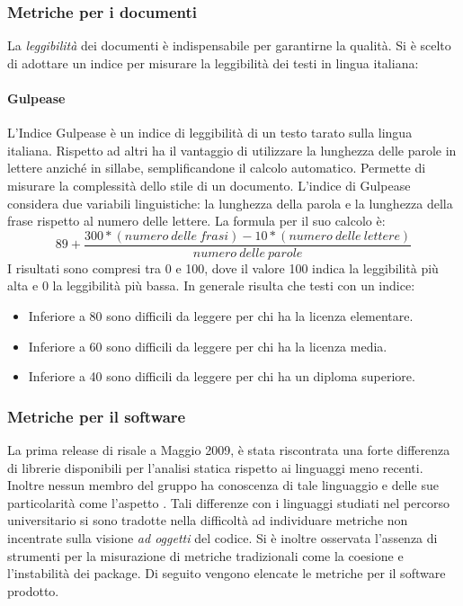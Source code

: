 		\subsubsection{Metriche per i documenti}
		La \emph{leggibilità} dei documenti è indispensabile per garantirne la qualità. Si è scelto di adottare un indice per misurare la leggibilità dei testi in lingua italiana:
			\paragraph{Gulpease}
			L'Indice Gulpease è un indice di leggibilità di un testo tarato sulla lingua italiana. Rispetto ad altri ha il vantaggio di utilizzare la lunghezza delle parole in lettere anziché in sillabe, semplificandone il calcolo automatico. Permette di misurare la complessità dello stile di un documento.
			L'indice di Gulpease considera due variabili linguistiche: la lunghezza della parola e la lunghezza della frase rispetto al numero delle lettere.
			La formula per il suo calcolo è: \\
			\[
			89 + \frac{300 * (numero\ delle\ frasi) - 10 * (numero\ delle\ lettere)}{numero\ delle\ parole}
			\]
			I risultati sono compresi tra 0 e 100, dove il valore 100 indica la leggibilità più alta e 0 la leggibilità più bassa. In generale risulta che testi con un indice:
			\begin{itemize}
				\item Inferiore a 80 sono difficili da leggere per chi ha la licenza elementare.
				\item Inferiore a 60 sono difficili da leggere per chi ha la licenza media.
				\item Inferiore a 40 sono difficili da leggere per chi ha un diploma superiore.
			\end{itemize}
			
		\subsubsection{Metriche per il software}
		La prima release di   risale a Maggio 2009, è stata riscontrata una forte differenza di librerie disponibili per l'analisi statica rispetto ai linguaggi meno recenti. Inoltre nessun membro del gruppo ha conoscenza di tale linguaggio e delle sue particolarità come l'aspetto . Tali differenze con i linguaggi studiati nel percorso universitario si sono tradotte nella difficoltà ad individuare metriche non incentrate sulla visione \emph{ad oggetti} del codice. Si è inoltre osservata l'assenza di strumenti per la misurazione di metriche tradizionali come la coesione e l'instabilità dei package.
		Di seguito vengono elencate le metriche per il software prodotto. 
		

